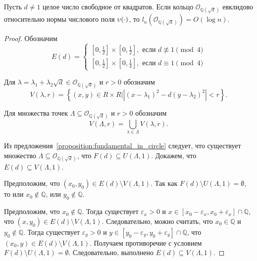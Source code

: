 \documentclass[_00_dissertation.tex]{subfiles}
\begin{document}
\begin{theorem}
    Пусть $d \neq 1$ целое число свободное от квадратов.
    Если кольцо $\mathcal{O}_{\mathbb{Q}(\sqrt{d})}$ евклидово относительно нормы числового поля $\upsilon(\cdot)$, то $l_n(\mathcal{O}_{\mathbb{Q}(\sqrt{d})}) = O(\log n)$.
\end{theorem}
\begin{proof}
    Обозначим
    \begin{equation*}
        E(d) = \begin{cases}
            \left[0, \frac{1}{2}\right] \times \left[0, \frac{1}{2}\right], \textrm{ если } d \not\equiv 1 \pmod 4\\
            \left[0, \frac{1}{2}\right] \times \left[0, \frac{1}{4}\right], \textrm{ если } d \equiv 1 \pmod 4
        \end{cases}
    \end{equation*}

    Для $\lambda = \lambda_1 + \lambda_2 \sqrt{d} \in \mathcal{O}_{\mathbb{Q}(\sqrt{d})}$ и $r > 0$ обозначим
    \begin{equation*}
        V(\lambda, r) = \left\{
            (x, y) \in R \times R \Big| \left|(x - \lambda_1)^2 - d(y - \lambda_2)^2\right| < r
        \right\}.
    \end{equation*}

    Для множества точек $\Lambda \subseteq \mathcal{O}_{\mathbb{Q}(\sqrt{d})}$ и $r > 0$ обозначим
    \begin{equation*}
        V(\Lambda, r) = \bigcup_{\lambda \in \Lambda} V(\lambda, r).
    \end{equation*}

    Из предложения~\ref{proposition:fundamental_in_circle} следует, что существует множество $\Lambda \subseteq \mathcal{O}_{\mathbb{Q}(\sqrt{d})}$, что $F(d) \subseteq U(\Lambda, 1)$.
    Докажем, что $E(d) \subseteq V(\Lambda, 1)$.

    Предположим, что $(x_0, y_0) \in E(d) \setminus V(\Lambda, 1)$.
    Так как $F(d) \setminus U(\Lambda, 1) = \emptyset$, то или $x_0 \not\in \mathbb{Q}$, или $y_0 \not\in \mathbb{Q}$.

    Предположим, что $x_0 \not\in \mathbb{Q}$.
    Тогда существует $\varepsilon_x > 0$ и $x \in [x_0 - \varepsilon_x, x_0 + \varepsilon_x] \cap \mathbb{Q}$, что $(x, y_0) \in E(d) \setminus V(\Lambda, 1)$.
    Следовательно, можно считать, что $x_0 \in \mathbb{Q}$ и $y_0 \not\in \mathbb{Q}$.
    Тогда существует $\varepsilon_y > 0$ и $y \in [y_0 - \varepsilon_y, y_0 + \varepsilon_y] \cap \mathbb{Q}$, что $(x_0, y) \in E(d) \setminus V(\Lambda, 1)$.
    Получаем противоречие с условием $F(d) \setminus U(\Lambda, 1) = \emptyset$.
    Следовательно, выполнено $E(d) \subseteq V(\Lambda, 1)$.


\end{proof}
\end{document}
